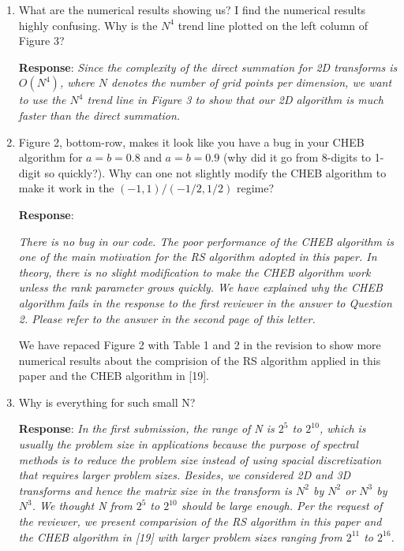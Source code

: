 \documentclass[11pt]{article}
\newcommand{\Response}{{\bf Response}}
\begin{document}
\begin{enumerate}
{%
}
 

\item  What are the numerical results showing us? I find the numerical results highly confusing. Why is the $N^4$ trend line plotted on the
left column of Figure 3? 

\Response: {\it Since the complexity of the direct summation for 2D transforms is $O(N^4)$, where $N$ denotes the number of grid points per dimension, we want to use the $N^4$ trend line in Figure 3 to show that our 2D algorithm is much faster than the direct summation.}


\item Figure 2, bottom-row, makes it look like you have a bug in your CHEB algorithm for $a=b=0.8$ and $a=b=0.9$ (why did it go from 8-digits to 1-digit so quickly?). Why can one not slightly modify the CHEB algorithm to make it work in the $(-1,1)/(-1/2,1/2)$ regime? 

\Response: {\it  There is no bug in our code. The poor performance of the CHEB algorithm is one of the main motivation for the RS algorithm adopted in this paper. In theory, there is no slight modification to make the CHEB algorithm work unless the rank parameter grows quickly. We have explained why the CHEB algorithm fails in the response to the first reviewer in the answer to Question 2. Please refer to the answer in the second page of this letter.

We have repaced Figure 2 with Table 1 and 2 in the revision to show more numerical results about the comprision of the RS algorithm applied in this paper and the CHEB algorithm in [19]. }

\item Why is everything for such small N? 

\Response: {\it  In the first submission, the range of N is $2^5$ to $2^{10}$, which is usually the problem size in applications because the purpose of spectral methods is to reduce the problem size instead of using spacial discretization that requires larger problem sizes.  Besides, we considered 2D and 3D transforms and hence the matrix size in the transform is $N^2$ by $N^2$ or $N^3$ by $N^3$. We thought N from $2^5$ to $2^{10}$ should be large enough. Per the request of the reviewer, we present comparision of the RS algorithm in this paper and the CHEB algorithm in [19] with larger problem sizes ranging from $2^{11}$ to $2^{16}$.}


\end{enumerate}
\end{document}
